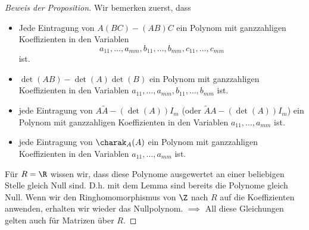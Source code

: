 \begin{proof}[Beweis der Proposition]
	Wir bemerken zuerst, dass
	\begin{itemize}
		\item Jede Eintragung von $A(BC) - (AB)C$ ein Polynom mit ganzzahligen Koeffizienten in den Variablen
			\[
			a_{11},\ldots,a_{mm},b_{11},\ldots,b_{mm},c_{11},\ldots,c_{mm} 
			\] 
			ist.
		\item $\det(AB) - \det(A) \det(B)$ ein Polynom mit ganzzahligen Koeffizienten in den Variablen $a_{11},\ldots,a_{mm}, b_{11}, \ldots, b_{mm}$ ist.
		\item jede Eintragung von $A \widetilde{A} - (\det(A)) I_{m}$ (oder $\widetilde{A} A - (\det(A)) I_{m}$) ein Polynom mit ganzzahligen Koeffizienten in den Variablen $a_{11},\ldots,a_{mm}$ ist.
		\item jede Eintragung von $\charak_{A}(A)$ ein Polynom mit ganzzahligen Koeffizienten in den Variablen $a_{11},\ldots,a_{mm}$ ist.
	\end{itemize}
	Für $R = \R$ wissen wir, dass diese Polynome ausgewertet an einer beliebigen Stelle gleich Null sind.
	D.h. mit dem Lemma sind bereits die Polynome gleich Null.
	Wenn wir den Ringhomomorphismus von $\Z$ nach $R$ auf die Koeffizienten anwenden, erhalten wir wieder das Nullpolynom.
	$\implies$ All diese Gleichungen gelten auch für Matrizen über $R$.
\end{proof}





















